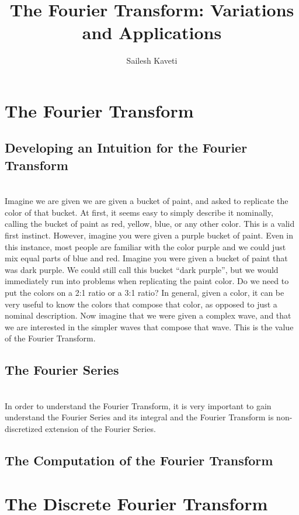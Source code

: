 \documentclass{amsproc}
\title{The Fourier Transform: Variations and Applications}
\author{Sailesh Kaveti}
\begin{document}
\maketitle

\section{The Fourier Transform}

\subsection{Developing an Intuition for the Fourier Transform}

\mbox{}	\\
\indent Imagine we are given we are given a bucket of paint, and asked to replicate the color of that bucket. At first, it seems easy to simply describe it nominally, calling the bucket of paint as red, yellow, blue, or any other color.  This is a valid first instinct. However, imagine you were given a purple bucket of paint. Even in this instance, most people are familiar with the color purple and we could just mix equal parts of blue and red. Imagine you were given a bucket of paint that was dark purple. We could still call this bucket “dark purple”, but we would immediately run into problems when replicating the paint color. Do we need to put the colors on a 2:1 ratio or a 3:1 ratio? In general, given a color, it can be very useful to know the colors that compose that color, as opposed to just a nominal description. Now imagine that we were given a complex wave, and that we are interested in the simpler waves that compose that wave. This is the value of the Fourier Transform.

\subsection{The Fourier Series}

\mbox{}	\\
\indent In order to understand the Fourier Transform, it is very important to gain understand the Fourier Series and its integral and the Fourier Transform is non-discretized extension of the Fourier Series.

\subsection{The Computation of the Fourier Transform}

\section{The Discrete Fourier Transform}
\end{document}
